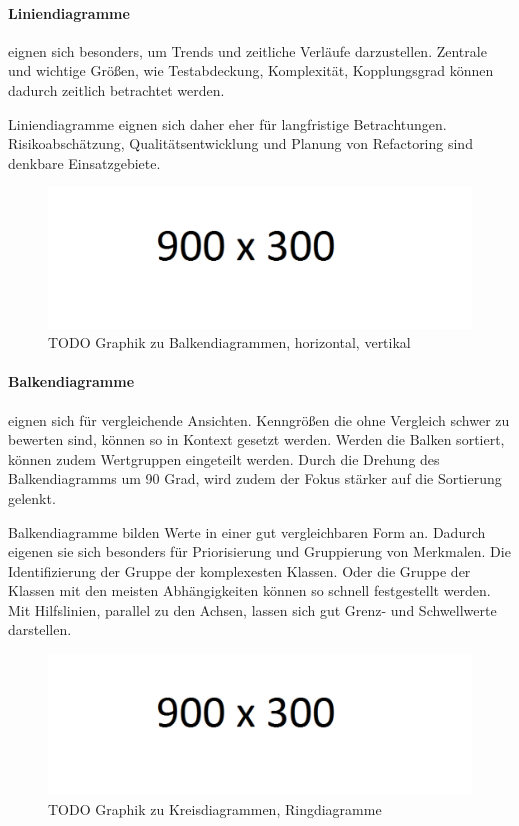 \paragraph{Liniendiagramme} eignen sich besonders, um Trends und zeitliche Verläufe darzustellen. Zentrale und wichtige Größen, wie Testabdeckung, Komplexität, Kopplungsgrad können dadurch zeitlich betrachtet werden. 

Liniendiagramme eignen sich daher eher für langfristige Betrachtungen. Risikoabschätzung, Qualitätsentwicklung und Planung von Refactoring sind denkbare Einsatzgebiete.

\begin{figure}[htbp]
  \includegraphics[width=\textwidth, height=\textheight, keepaspectratio]
    {resources/900x300.pdf}
  \caption{TODO Graphik zu Balkendiagrammen, horizontal, vertikal}
  \label{bar-chart}
\end{figure}
\paragraph{Balkendiagramme} eignen sich für vergleichende Ansichten. Kenngrößen die ohne Vergleich schwer zu bewerten sind, können so in Kontext gesetzt werden. Werden die Balken sortiert, können zudem Wertgruppen eingeteilt werden. Durch die Drehung des Balkendiagramms um 90 Grad, wird zudem der Fokus stärker auf die Sortierung gelenkt.

Balkendiagramme bilden Werte in einer gut vergleichbaren Form an. Dadurch eigenen sie sich besonders für Priorisierung und Gruppierung von Merkmalen.
Die Identifizierung der Gruppe der komplexesten Klassen. Oder die Gruppe der Klassen mit den meisten Abhängigkeiten können so schnell festgestellt werden. Mit Hilfslinien, parallel zu den Achsen, lassen sich gut Grenz- und Schwellwerte darstellen.

\begin{figure}[htbp]
  \includegraphics[width=\textwidth, height=\textheight, keepaspectratio]
    {resources/900x300.pdf}
  \caption{TODO Graphik zu Kreisdiagrammen, Ringdiagramme}
  \label{circle-chart}
\end{figure}
